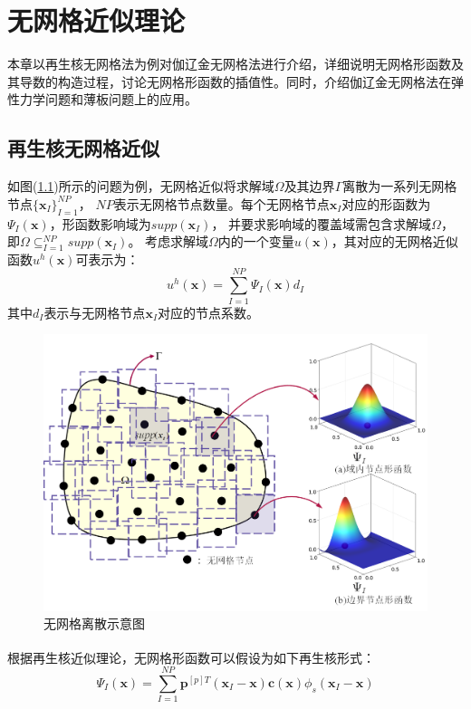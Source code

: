 \chapter{无网格近似理论}
本章以再生核无网格法为例对伽辽金无网格法进行介绍，详细说明无网格形函数及其导数的构造过程，讨论无网格形函数的插值性。同时，介绍伽辽金无网格法在弹性力学问题和薄板问题上的应用。
\section{再生核无网格近似}
如图(\ref{nomeshpoint})所示的问题为例，无网格近似将求解域$\Omega$及其边界$\Gamma$离散为一系列无网格节点$\{\pmb{x}_I\}^{N\!P}_{I=1}$，
$N\!P$表示无网格节点数量。每个无网格节点$\pmb{x}_I$对应的形函数为$\Psi_I(\pmb{x})$，形函数影响域为$supp(\pmb{x}_I)$，
并要求影响域的覆盖域需包含求解域$\Omega$，即$\Omega\subseteq^{N\!P}_{I=1}supp(\pmb{x}_I)$。
考虑求解域$\Omega$内的一个变量$u(\pmb{x})$，其对应的无网格近似函数$u^h(\pmb{x})$可表示为：
\begin{equation}\label{ui}
    u^h(\pmb{x})=\sum_{I=1}^{N\!P}\Psi_I(\pmb{x})d_{I}
\end{equation}
其中$d_{I}$表示与无网格节点$\pmb{x}_I$对应的节点系数。\par
\begin{figure}[H]
\centering
    \includegraphics[scale=0.6]{Figure/nomesh/point.png}
    \caption{无网格离散示意图}\label{nomeshpoint}
\end{figure}\par
根据再生核近似理论\textsuperscript{\cite{liu1995}}，无网格形函数可以假设为如下再生核形式：
\begin{equation}\label{shapefunction}
        \Psi_I(\pmb{x})=\sum_{I=1}^{N\!P}\pmb{p}^{[p]T}(\pmb{x}_I-\pmb{x})\pmb{c}(\pmb{x})\phi_s(\pmb{x}_I-\pmb{x})
\end{equation}
